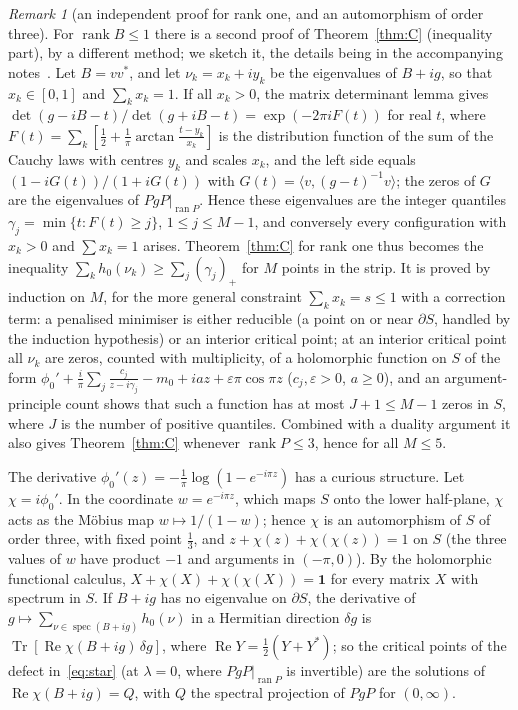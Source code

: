 \documentclass[11pt]{amsart}
\theoremstyle{definition}
\theoremstyle{remark}
\newtheorem{remark}[theorem]{Remark}
\numberwithin{equation}{section}
\newcommand{\Tr}{\operatorname{Tr}}
\newcommand{\spec}{\operatorname{spec}}
\renewcommand{\Re}{\operatorname{Re}}
\newcommand{\one}{\mathbf{1}}
\newcommand{\ip}[2]{\langle #1,#2\rangle}
\begin{document}
\begin{remark}[an independent proof for rank one, and an automorphism of order three]\label{rem:rankone}
For $\operatorname{rank}B\le1$ there is a second proof of Theorem~\ref{thm:C} (inequality part), by a different method;
we sketch it, the details being in the accompanying notes~\cite{repo-oqp27}. Let $B=vv^*$, and let
$\nu_k=x_k+iy_k$ be the eigenvalues of $B+ig$, so that $x_k\in[0,1]$ and $\sum_kx_k=1$. If all $x_k>0$, the matrix
determinant lemma gives $\det(g-iB-t)/\det(g+iB-t)=\exp(-2\pi iF(t))$ for real $t$, where
$F(t)=\sum_k[\frac12+\frac1\pi\arctan\frac{t-y_k}{x_k}]$ is the distribution function of the sum of the Cauchy laws with
centres $y_k$ and scales $x_k$, and the left side equals $(1-iG(t))/(1+iG(t))$ with $G(t)=\ip v{(g-t)^{-1}v}$; the zeros of
$G$ are the eigenvalues of $PgP|_{\operatorname{ran}P}$. Hence these eigenvalues are the integer quantiles
$\gamma_j=\min\{t:F(t)\ge j\}$, $1\le j\le M-1$, and conversely every configuration with $x_k>0$ and $\sum x_k=1$ arises.
Theorem~\ref{thm:C} for rank one thus becomes the inequality $\sum_kh_0(\nu_k)\ge\sum_j(\gamma_j)_+$ for $M$ points in the
strip. It is proved by induction on $M$, for the more general constraint $\sum_kx_k=s\le1$ with a correction term: a
penalised minimiser is either reducible (a point on or near $\partial S$, handled by the induction hypothesis) or an
interior critical point; at an interior critical point all $\nu_k$ are zeros, counted with multiplicity, of a holomorphic
function on $S$ of the form $\phi_0'+\frac i\pi\sum_j\frac{c_j}{z-i\gamma_j}-m_0+iaz+\varepsilon\pi\cos\pi z$ ($c_j,\varepsilon>0$, $a\ge0$),
and an argument-principle count shows that such a function has at most $J+1\le M-1$ zeros in $S$, where $J$ is the
number of positive quantiles. Combined with a duality argument it also gives Theorem~\ref{thm:C} whenever
$\operatorname{rank}P\le3$, hence for all $M\le5$.

The derivative $\phi_0'(z)=-\frac1\pi\log(1-e^{-i\pi z})$ has a curious structure. Let $\chi=i\phi_0'$. In the coordinate
$w=e^{-i\pi z}$, which maps $S$ onto the lower half-plane, $\chi$ acts as the M\"obius map $w\mapsto1/(1-w)$; hence
$\chi$ is an automorphism of $S$ of order three, with fixed point $\frac13$, and $z+\chi(z)+\chi(\chi(z))=1$ on $S$ (the
three values of $w$ have product $-1$ and arguments in $(-\pi,0)$). By the holomorphic functional calculus,
$X+\chi(X)+\chi(\chi(X))=\one$ for every matrix $X$ with spectrum in $S$. If $B+ig$ has no eigenvalue on $\partial S$, the
derivative of $g\mapsto\sum_{\nu\in\spec(B+ig)}h_0(\nu)$ in a Hermitian direction $\delta g$ is $\Tr[\Re\chi(B+ig)\,\delta g]$,
where $\Re Y=\frac12(Y+Y^*)$; so the critical points of the defect in~\eqref{eq:star} (at $\lambda=0$, where
$PgP|_{\operatorname{ran}P}$ is invertible) are the solutions of $\Re\chi(B+ig)=Q$, with $Q$ the spectral projection of
$PgP$ for $(0,\infty)$.
\end{remark}
\end{document}
